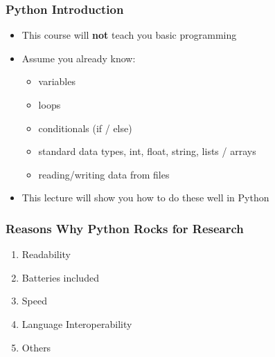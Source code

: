 \documentclass[t,10pt,compress=false,usepdftitle=false]{beamer}
\begin{document}
\begin{frame}[fragile]
    \frametitle{Python Introduction}
    \begin{itemize}
        \item This course will \textbf{not} teach you basic programming
        \pause
        \item Assume you already know:
	\begin{itemize}
	    \item variables
	    \item loops
	    \item conditionals (if / else)
	    \item standard data types, int, float, string, lists / arrays
	    \item reading/writing data from files
	\end{itemize}
	\pause
	\item This lecture will show you how to do these well in Python
    \end{itemize}
\end{frame}

\begin{frame}[fragile]
    \frametitle{Reasons Why Python Rocks for Research}
    \begin{enumerate}
        \item Readability
        \item Batteries included
        \item Speed
        \item Language Interoperability
        \item Others
    \end{enumerate}
\end{frame}
\end{document}
